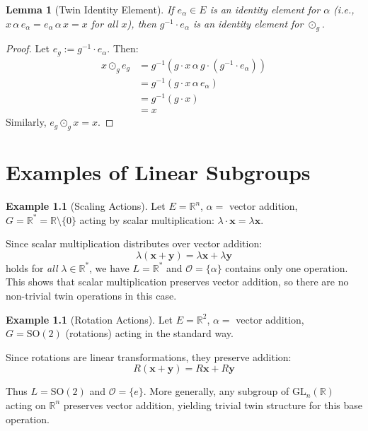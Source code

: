 \documentclass[11pt,a4paper,openany]{book}
\theoremstyle{plain}
\newtheorem{lemma}[theorem]{Lemma}
\theoremstyle{definition}
\newtheorem{example}[theorem]{Example}
\newcommand{\twing}[1]{\odot_{#1}}
\newcommand{\opspace}{\mathcal{O}}
\newcommand{\lingroup}{L}
\newcommand{\actspace}{E}
\newcommand{\groupG}{G}
\newcommand{\RR}{\mathbb{R}}
\newcommand{\GL}{\mathrm{GL}}
\newcommand{\SO}{\mathrm{SO}}
\begin{document}
\begin{lemma}[Twin Identity Element]\label{lem:twin-identity}
If $e_\alpha \in \actspace$ is an identity element for $\alpha$ (i.e., $x \,\alpha\, e_\alpha = e_\alpha \,\alpha\, x = x$ for all $x$), then $g^{-1} \cdot e_\alpha$ is an identity element for $\twing{g}$.
\end{lemma}

\begin{proof}
Let $e_g := g^{-1} \cdot e_\alpha$. Then:
\begin{align*}
x \twing{g} e_g &= g^{-1}(g \cdot x \,\alpha\, g \cdot (g^{-1} \cdot e_\alpha)) \\
&= g^{-1}(g \cdot x \,\alpha\, e_\alpha) \\
&= g^{-1}(g \cdot x) \\
&= x
\end{align*}
Similarly, $e_g \twing{g} x = x$.
\end{proof}


\chapter{Examples of Linear Subgroups}
\label{app:linear-examples}

\begin{example}[Scaling Actions]\label{ex:scaling}
Let $\actspace = \RR^n$, $\alpha = $ vector addition, $\groupG = \RR^* = \RR \setminus \{0\}$ acting by scalar multiplication: $\lambda \cdot \mathbf{x} = \lambda \mathbf{x}$.

Since scalar multiplication distributes over vector addition:
\[
\lambda(\mathbf{x} + \mathbf{y}) = \lambda \mathbf{x} + \lambda \mathbf{y}
\]
holds for \emph{all} $\lambda \in \RR^*$, we have $\lingroup = \RR^*$ and $\opspace = \{\alpha\}$ contains only one operation. This shows that scalar multiplication preserves vector addition, so there are no non-trivial twin operations in this case.
\end{example}

\begin{example}[Rotation Actions]\label{ex:rotations}\index{$\SO(2)$}
Let $\actspace = \RR^2$, $\alpha = $ vector addition, $\groupG = \SO(2)$ (rotations) acting in the standard way.

Since rotations are linear transformations, they preserve addition:
\[
R(\mathbf{x} + \mathbf{y}) = R\mathbf{x} + R\mathbf{y}
\]

Thus $\lingroup = \SO(2)$ and $\opspace = \{e\}$. More generally, any subgroup of $\GL_n(\RR)$ acting on $\RR^n$ preserves vector addition, yielding trivial twin structure for this base operation.
\end{example}
\end{document}
